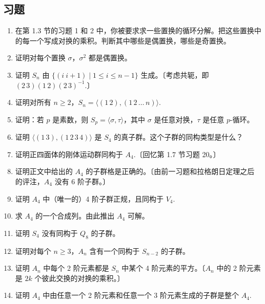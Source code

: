 \subsection*{习题}

\begin{enumerate}
\item 在第 1.3 节的习题 1 和 2 中，你被要求求一些置换的循环分解。把这些置换中的每一个写成对换的乘积。判断其中哪些是偶置换，哪些是奇置换。

\item 证明对每个置换 \(\sigma\)，\(\sigma^2\) 都是偶置换。

\item 证明 \(S_n\) 由 \(\{(i\ i+1) \mid 1 \leq i \leq n-1\}\) 生成。〔考虑共轭，即 \((2\,3)(1\,2)(2\,3)^{-1}\).〕

\item 证明对所有 \(n \geq 2\)，\(S_n = \langle (1\,2), (1\,2\,\ldots\,n) \rangle\).

\item 证明：若 \(p\) 是素数，则 \(S_p = \langle \sigma, \tau \rangle\)，其中 \(\sigma\) 是任意对换，\(\tau\) 是任意 \(p\)-循环。

\item 证明 \(\langle (1\,3), (1\,2\,3\,4) \rangle\) 是 \(S_4\) 的真子群。这个子群的同构类型是什么？

\item 证明正四面体的刚体运动群同构于 \(A_4\).〔回忆第 1.7 节习题 20。〕

\item 证明正文中给出的 \(A_4\) 的子群格是正确的。〔由前一习题和拉格朗日定理之后的评注，\(A_4\) 没有 6 阶子群。〕

\item 证明 \(A_4\) 中（唯一的）4 阶子群正规，且同构于 \(V_4\).

\item 求 \(A_4\) 的一个合成列。由此推出 \(A_4\) 可解。

\item 证明 \(S_4\) 没有同构于 \(Q_8\) 的子群。

\item 证明对每个 \(n \geq 3\)，\(A_n\) 含有一个同构于 \(S_{n-2}\) 的子群。

\item 证明 \(A_n\) 中每个 2 阶元素都是 \(S_n\) 中某个 4 阶元素的平方。〔\(A_n\) 中的 2 阶元素是 \(2k\) 个彼此交换的对换的乘积。〕

\item 证明 \(A_4\) 中由任意一个 2 阶元素和任意一个 3 阶元素生成的子群是整个 \(A_4\).


\end{enumerate}
